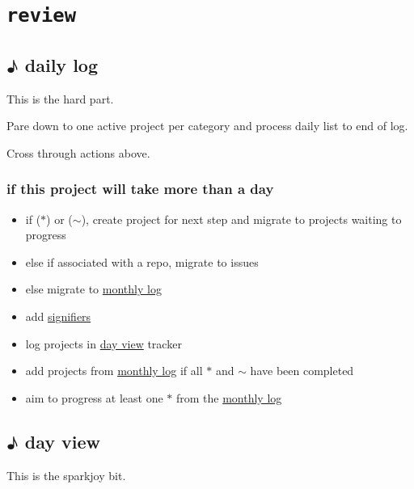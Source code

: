 \documentclass[]{book}
\begin{document}
\hypertarget{review}{%
\section{\texorpdfstring{\textbf{\texttt{review}}}{review}}\label{review}}

\hypertarget{dayview:daily-log}{%
\subsection{♪ daily log}\label{dayview:daily-log}}

This is the hard part.

Pare down to one active project per category and process daily list to end of log.

Cross through actions above.

\hypertarget{if-this-project-will-take-more-than-a-day}{%
\subsubsection{if this project will take more than a day}\label{if-this-project-will-take-more-than-a-day}}

\begin{itemize}
\item
  if (\(*\)) or (\(\sim\)), create project for next step and migrate to projects waiting to progress
\item
  else if associated with a repo, migrate to issues
\item
  else migrate to \protect\hyperlink{monthly-log}{monthly log}
\item
  add \protect\hyperlink{signifiers}{signifiers}
\item
  log projects in \protect\hyperlink{day-view}{day view} tracker
\item
  add projects from \protect\hyperlink{monthly-log}{monthly log} if all \(*\) and \(\sim\) have been completed
\item
  aim to progress at least one \(*\) from the \protect\hyperlink{monthly-log}{monthly log}
\end{itemize}

\hypertarget{day-view}{%
\subsection{♪ day view}\label{day-view}}

This is the sparkjoy bit.
\end{document}
